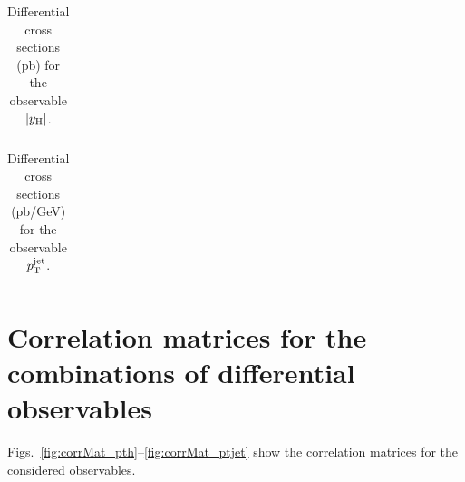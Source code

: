 \begin{table}[h!]
    \caption{
        Differential cross sections (pb) for the observable $\left|y_\mathrm{H}\right| $.
        }
    \label{tab:numbers_absy}
    \scriptsize
    \begin{center}
    \begin{tabular}{|l|c|c|c|c|c|c|}
    \hline
     \\
    \hline
    \end{tabular}
    \end{center}
    \end{table}

\begin{table}[h!]
    \caption{
        Differential cross sections (pb/GeV) for the observable $p_\mathrm{T}^\text{jet} $.
        }
    \label{tab:numbers_ptjet}
    \scriptsize
    \begin{center}
    \begin{tabular}{|l|c|c|c|c|c|}
    \hline
     \\
    \hline
    \end{tabular}
    \end{center}
    \end{table}


\clearpage
\section{Correlation matrices for the combinations of differential observables}
\label{sec:binToBinCorrelationMatrices}

Figs.~\ref{fig:corrMat_pth}--\ref{fig:corrMat_ptjet} show the correlation matrices for the considered observables.

